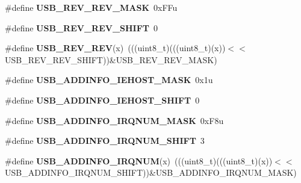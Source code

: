 \begin{DoxyCompactItemize}
\item 
\mbox{\label{group___u_s_b___register___masks_ga72a356a066674e41e3827b0ccb931e71}} 
\#define {\bfseries U\+S\+B\+\_\+\+R\+E\+V\+\_\+\+R\+E\+V\+\_\+\+M\+A\+SK}~0x\+F\+Fu
\item 
\mbox{\label{group___u_s_b___register___masks_gab058ebe4be52454e46ef15ce015ac5fd}} 
\#define {\bfseries U\+S\+B\+\_\+\+R\+E\+V\+\_\+\+R\+E\+V\+\_\+\+S\+H\+I\+FT}~0
\item 
\mbox{\label{group___u_s_b___register___masks_ga30e7698a3bfac84ce89aee7d2d0498f4}} 
\#define {\bfseries U\+S\+B\+\_\+\+R\+E\+V\+\_\+\+R\+EV}(x)~(((uint8\+\_\+t)(((uint8\+\_\+t)(x))$<$$<$U\+S\+B\+\_\+\+R\+E\+V\+\_\+\+R\+E\+V\+\_\+\+S\+H\+I\+FT))\&U\+S\+B\+\_\+\+R\+E\+V\+\_\+\+R\+E\+V\+\_\+\+M\+A\+SK)
\item 
\mbox{\label{group___u_s_b___register___masks_gacb7c792034c73c4861bc8fba6ff4314f}} 
\#define {\bfseries U\+S\+B\+\_\+\+A\+D\+D\+I\+N\+F\+O\+\_\+\+I\+E\+H\+O\+S\+T\+\_\+\+M\+A\+SK}~0x1u
\item 
\mbox{\label{group___u_s_b___register___masks_gad256dcdfe8443877169b69dbcc8a041e}} 
\#define {\bfseries U\+S\+B\+\_\+\+A\+D\+D\+I\+N\+F\+O\+\_\+\+I\+E\+H\+O\+S\+T\+\_\+\+S\+H\+I\+FT}~0
\item 
\mbox{\label{group___u_s_b___register___masks_gaa578584bfaf89e26213e6ba12e5f4b0e}} 
\#define {\bfseries U\+S\+B\+\_\+\+A\+D\+D\+I\+N\+F\+O\+\_\+\+I\+R\+Q\+N\+U\+M\+\_\+\+M\+A\+SK}~0x\+F8u
\item 
\mbox{\label{group___u_s_b___register___masks_ga3332243caa9e2f9cfc49b031ac54cbda}} 
\#define {\bfseries U\+S\+B\+\_\+\+A\+D\+D\+I\+N\+F\+O\+\_\+\+I\+R\+Q\+N\+U\+M\+\_\+\+S\+H\+I\+FT}~3
\item 
\mbox{\label{group___u_s_b___register___masks_ga0ab998135e9b4c5e89fa598b54bf96a3}} 
\#define {\bfseries U\+S\+B\+\_\+\+A\+D\+D\+I\+N\+F\+O\+\_\+\+I\+R\+Q\+N\+UM}(x)~(((uint8\+\_\+t)(((uint8\+\_\+t)(x))$<$$<$U\+S\+B\+\_\+\+A\+D\+D\+I\+N\+F\+O\+\_\+\+I\+R\+Q\+N\+U\+M\+\_\+\+S\+H\+I\+FT))\&U\+S\+B\+\_\+\+A\+D\+D\+I\+N\+F\+O\+\_\+\+I\+R\+Q\+N\+U\+M\+\_\+\+M\+A\+SK)

\end{DoxyCompactItemize}
